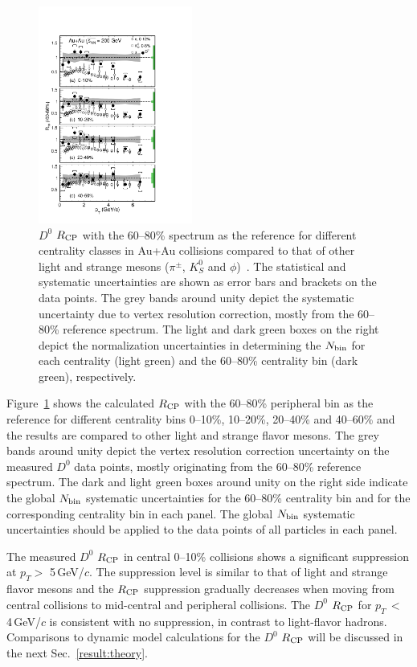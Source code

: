 \documentclass[%
 reprint,	
 amsmath,amssymb,
 aps,
 prc,
]{revtex4-1}
\begin{document}
\begin{figure}
\centering
\includegraphics[width=0.45\textwidth]{fig/D0_Rcp1.pdf}
\caption{$D^{0}$ $R_{\rm CP}$ with the 60--80\% spectrum as the reference for different centrality classes in Au+Au collisions compared to that of other light and strange mesons ($\pi^{\pm}$, $K^0_{S}$ and $\phi$)~\cite{Adams2006_Identified,Abelev2009,Agakishiev2012}. The statistical and systematic uncertainties are shown as error bars and brackets on the data points. The grey bands around unity depict the systematic uncertainty due to vertex resolution correction, mostly from the 60--80\% reference spectrum. The light and dark green boxes on the right depict the normalization uncertainties in determining the $N_{\rm bin}$ for each centrality (light green) and the 60--80\% centrality bin (dark green), respectively.}
\label{fig:D0_Rcp} 
\end{figure}

Figure~\ref{fig:D0_Rcp} shows the calculated $R_{\rm CP}$ with the 60--80\% peripheral bin as the reference for different centrality bins 0--10\%, 10--20\%, 20--40\% and 40--60\% and the results are compared to other light and strange flavor mesons. The grey bands around unity depict the vertex resolution correction uncertainty on the measured $D^0$ data points, mostly originating from the 60--80\% reference spectrum. The dark and light green boxes around unity on the right side indicate the global $N_{\rm bin}$ systematic uncertainties for the 60--80\% centrality bin and for the corresponding centrality bin in each panel. The global $N_{\rm bin}$ systematic uncertainties should be applied to the data points of all particles in each panel.

The measured $D^0$ $R_{\rm CP}$ in central 0--10\% collisions shows a significant suppression at $p_{T}>$ 5\,GeV/$c$. The suppression level is similar to that of light and strange flavor mesons and the $R_{\rm CP}$ suppression gradually decreases when moving from central collisions to mid-central and peripheral collisions. The $D^0$ $R_{\rm CP}$ for $p_{T}$\,$<$\,4\,GeV/$c$ is consistent with no suppression, in contrast to light-flavor hadrons. Comparisons to dynamic model calculations for the $D^0$ $R_{\rm CP}$ will be discussed in the next Sec.~\ref{result:theory}.
\end{document}
